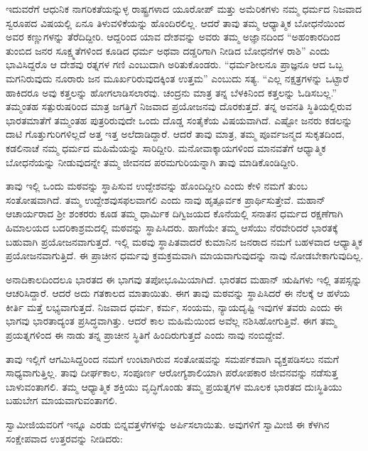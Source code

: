 ಇದುವರೆಗೆ ಆಧುನಿಕ ನಾಗರಿಕತೆಯನ್ನುಳ್ಳ ರಾಷ್ಟ್ರಗಳಾದ ಯೂರೋಪ್​ ಮತ್ತು ಅಮೆರಿಕಗಳು ನಮ್ಮ ಧರ್ಮದ ನಿಜವಾದ ಸ್ವರೂಪದ ವಿಷಯಲ್ಲಿ ಏನೂ ತಿಳುವಳಿಕೆಯನ್ನು ಹೊಂದಿರಲಿಲ್ಲ. ಆದರೆ ತಾವು ತಮ್ಮ ಆಧ್ಯಾತ್ಮಿಕ ಬೋಧನೆಯಿಂದ ಅವರ ಕಣ್ಣುಗಳನ್ನು ತೆರೆದಿದ್ದೀರಿ. ಆದ್ದರಿಂದ ಯಾವ ದೇಶವನ್ನು ಅವರು ತಮ್ಮ ಅಜ್ಞಾನದಿಂದ “ಅಹಂಕಾರದಿಂದ ತುಂಬಿದ ಜನರ ಸೂಕ್ಷ್ಮತೆಗಳಿಂದ ಕೂಡಿದ ಧರ್ಮ ಅಥವಾ ದಡ್ಡರಿಗಾಗಿ ನೀಡಿದ ಬೋಧನೆಗಳ ರಾಶಿ” ಎಂದು ಭಾವಿಸಿದ್ದರೊ ಆ ದೇಶವು ರತ್ನಗಳ ಗಣಿ ಎಂಬುದಾಗಿ ಅರಿತುಕೊಂಡರು. “ಧರ್ಮಶೀಲನೂ ಪ್ರಾಜ್ಞನೂ ಆದ ಒಬ್ಬ ಮಗನಿರುವುದು ನೂರಾರು ಜನ ಮೂರ್ಖರಿರುವುದಕ್ಕಿಂತ ಉತ್ತಮ” ಎಂಬುದು ಸತ್ಯ. “ಎಲ್ಲ ನಕ್ಷತ್ರಗಳನ್ನು ಒಟ್ಟಾರೆ ಹಾಕಿದರೂ ಅವು ಕತ್ತಲನ್ನು ಹೋಗಲಾಡಿಸಲಾರವು. ಚಂದ್ರನು ಮಾತ್ರ ತನ್ನ ಬೆಳಕಿನಿಂದ ಕತ್ತಲನ್ನು ಓಡಿಸಬಲ್ಲ.” ತಮ್ಮಂತಹ ಸತ್ಪುರುಷರಿಂದ ಮಾತ್ರ ಜಗತ್ತಿಗೆ ನಿಜವಾದ ಪ್ರಯೋಜನವು ದೊರಕುತ್ತದೆ. ತನ್ನ ಅವನತಿ ಸ್ಥಿತಿಯಲ್ಲಿರುವ ಭಾರತಮಾತೆಗೆ ತಮ್ಮಂತಹ ಪುತ್ರರಿರುವುದೇ ಒಂದು ದೊಡ್ಡ ಸಂತೈಕೆಯ ವಿಷಯವಾಗಿದೆ. ಎಷ್ಟೋ ಜನರು ಕಡಲನ್ನು ದಾಟಿ ಗೊತ್ತುಗುರಿಗಳಿಲ್ಲದೆ ಅತ್ತ ಇತ್ತ ಅಲೆದಾಡಿದ್ದಾರೆ. ಆದರೆ ತಾವು ಮಾತ್ರ, ತಮ್ಮ ಪೂರ್ವಜನ್ಮದ ಸುಕೃತದಿಂದ, ಕಡಲಿನಾಚೆ ನಮ್ಮ ಧರ್ಮದ ಮಹಿಮೆಯನ್ನು ಸಾರಿದ್ದೀರಿ. ಮನೋವಾಕ್ಕಾಯಗಳಿಂದ ಮಾನವತೆಗೆ ಆಧ್ಯಾತ್ಮಿಕ ಬೋಧನೆಯನ್ನು ನೀಡುವುದನ್ನೇ ತಮ್ಮ ಜೀವನದ ಪರಮಗುರಿಯನ್ನಾಗಿ ತಾವು ಮಾಡಿಕೊಂಡಿದ್ದೀರಿ. 

ತಾವು ಇಲ್ಲಿ ಒಂದು ಮಠವನ್ನು ಸ್ಥಾಪಿಸುವ ಉದ್ದೇಶವನ್ನು ಹೊಂದಿದ್ದೀರಿ ಎಂದು ಕೇಳಿ ನಮಗೆ ತುಂಬ ಸಂತೋಷವಾಗಿದೆ. ತಮ್ಮ ಉದ್ದೇಶವು\break ಸಫಲವಾಗಲಿ ಎಂದು ನಾವು ಹೃತ್ಪೂರ್ವಕ ಪ್ರಾರ್ಥಿಸುತ್ತೇವೆ. ಮಹಾನ್​ ಆಚಾರ್ಯರಾದ ಶ‍್ರೀ ಶಂಕರರು ಕೂಡ ತಮ್ಮ ಧಾರ್ಮಿಕ ದಿಗ್ವಿಜಯದ ಕೊನೆಯಲ್ಲಿ ಸನಾತನ ಧರ್ಮದ ರಕ್ಷಣೆಗಾಗಿ ಹಿಮಾಲಯದ ಬದರಿಕಾಶ್ರಮದಲ್ಲಿ ಮಠವನ್ನು ಸ್ಥಾಪಿಸಿದರು. ಹಾಗೆಯೇ ತಮ್ಮ ಆಸೆಯು ನೆರವೇರಿದರೆ ಭಾರತಕ್ಕೆ ಬಹುವಾಗಿ ಪ್ರಯೋಜನವಾಗುತ್ತದೆ. ಇಲ್ಲಿ ಮಠವು ಸ್ಥಾಪಿತವಾದರೆ ಕುಮಾನಿನ ಜನರಾದ ನಮಗೆ ಬಹಳವಾದ ಆಧ್ಯಾತ್ಮಿಕ ಪ್ರಯೋಜನವಾಗುತ್ತಿದೆ. ಈ ಪ್ರಾಚೀನ ಧರ್ಮವು ಕ್ರಮಕ್ರಮವಾಗಿ ಮಾಯವಾಗುವುದನ್ನು ನಾವು ನೋಡಬೇಕಾಗುವುದಿಲ್ಲ. 

ಅನಾದಿಕಾಲದಿಂದಲೂ ಭಾರತದ ಈ ಭಾಗವು ತಪೋಭೂಮಿಯಾಗಿದೆ. ಭಾರತದ ಮಹಾನ್​ ಋಷಿಗಳು ಇಲ್ಲಿ ತಪಸ್ಸನ್ನು ಆಚರಿಸಿದ್ದಾರೆ. ಆದರೆ ಅದು ಗತಕಾಲದ ಮಾತಾಯಿತು. ಈಗ ತಾವು ಮಠವನ್ನು ಸ್ಥಾಪಿಸಿದರೆ ಈ ನೆಲಕ್ಕೆ ಆ ಹಳೆಯ ಕೀರ್ತಿ ಮತ್ತೆ ಲಭ್ಯವಾಗುತ್ತದೆ. ನಿಜವಾದ ಧರ್ಮ, ಕರ್ಮ, ಸಂಯಮ, ನ್ಯಾಯದೃಷ್ಟಿ ಇವುಗಳ ತವರು ಎಂದು ಈ ಭಾಗವು ಭಾರತಾದ್ಯಂತ ಪ್ರಸಿದ್ಧವಾಗಿತ್ತು. ಆದರೆ ಕಾಲ ಮಹಿಮೆಯಿಂದ ಅವೆಲ್ಲ ನಶಿಸಿಹೋಗುತ್ತಿವೆ. ಈಗ ತಮ್ಮ ಪ್ರಯತ್ನಗಳಿಂದ ಈ ನಾಡು ತನ್ನ ಪ್ರಾಚೀನ ಸ್ಥಿತಿಗೆ ಹಿಂದಿರುಗುತ್ತದೆ ಎಂದು ನಾವು ನಂಬಿದ್ದೇವೆ. 

ತಾವು ಇಲ್ಲಿಗೆ ಆಗಮಿಸಿದ್ದರಿಂದ ನಮಗೆ ಉಂಟಾಗಿರುವ ಸಂತೋಷವನ್ನು ಸಮರ್ಪಕವಾಗಿ ವ್ಯಕ್ತಪಡಿಸಲು ನಮಗೆ ಸಾಧ್ಯವಾಗುತ್ತಿಲ್ಲ. ತಾವು ದೀರ್ಘಕಾಲ, ಸಂಪೂರ್ಣ ಆರೋಗ್ಯಶಾಲಿಯಾಗಿ ಪರೋಪಕಾರ ಜೀವನವನ್ನು ನಡೆಸುತ್ತ ಬಾಳುವಂತಾಗಲಿ. ತಮ್ಮ ಆಧ್ಯಾತ್ಮಿಕ ಶಕ್ತಿಯು ವೃದ್ಧಿಗೊಂಡು ತಮ್ಮ ಪ್ರಯತ್ನಗಳ ಮೂಲಕ ಭಾರತದ ದುಃಸ್ಥಿತಿಯು ಬಹುಬೇಗ ಮಾಯವಾಗುವಂತಾಗಲಿ. 

ಸ್ವಾಮೀಜಿಯವರಿಗೆ ಇನ್ನೂ ಎರಡು ಬಿನ್ನವತ್ತಳೆಗಳನ್ನು ಅರ್ಪಿಸಲಾಯಿತು. ಅವುಗಳಿಗೆ ಸ್ವಾಮೀಜಿ ಈ ಕೆಳಗಿನ ಸಂಕ್ಷೇಪವಾದ ಉತ್ತರವನ್ನು ನೀಡಿದರು:

